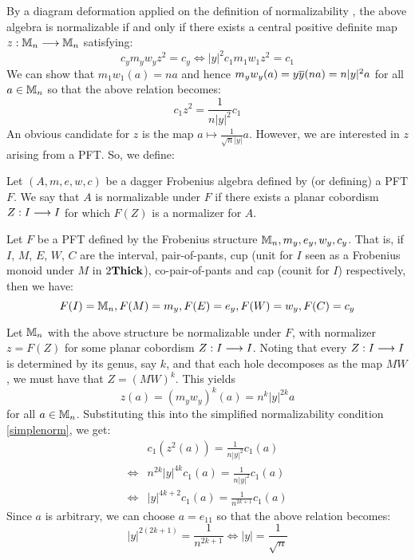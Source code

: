 \documentclass[./Thick_TQFTs_and_Quantum_Information.tex]{subfiles}
\begin{document}
By a diagram deformation applied on the definition of normalizability
\cite[9]{CatQChan}, the above algebra is normalizable if and only if there
exists a central positive definite map $z : \mathbb{M}_n \stackrel{}{\longrightarrow} \mathbb{M}_n$ satisfying:
\[
  c_ym_yw_yz^2 = c_y \iff |y|^2c_1m_1w_1z^2 = c_1
\]
We can show that $m_1w_1(a) = na$ and hence $m_yw_y(a) = y\overline{y} (na)
= n|y|^2 a$ for all $a \in \mathbb{M}_n$ so that the above relation becomes:
\begin{equation}\label{simplenorm}
  c_1z^2 = \frac{1}{n|y|^2}c_1
\end{equation}
An obvious candidate for $z$ is the map $a \mapsto \frac{1}{\sqrt{n}|y|} a$.
However, we are interested in $z$ arising from a PFT. So, we define:
\begin{defn}
Let $(A, m, e, w, c)$ be a dagger Frobenius algebra defined by (or defining) a
PFT $F$. We say that $A$ is normalizable under $F$ if there exists a planar
cobordism $Z : I \stackrel{}{\longrightarrow} I$ for which $F(Z)$ is a normalizer for $A$.
\end{defn}

Let $F$ be a PFT defined by the Frobenius structure $\mathbb{M}_n, m_y, e_y, w_y, c_y$.
That is, if $I$, $M$, $E$, $W$, $C$ are the interval, pair-of-pants, cup (unit
for $I$ seen as a Frobenius monoid under $M$ in $2\textbf{Thick}$), co-pair-of-pants and
cap (counit for $I$) respectively, then we have:
\[
  F(I) = \mathbb{M}_n, F(M) = m_y, F(E) = e_y, F(W) = w_y, F(C) = c_y
\]

Let $\mathbb{M}_{n}$ with the above structure be normalizable under $F$, with normalizer
$z = F(Z)$ for some planar cobordism $Z : I \stackrel{}{\longrightarrow} I$. Noting that every
$Z : I \stackrel{}{\longrightarrow} I$ is determined by its genus, say $k$, and that each hole
decomposes as the map $MW$, we must have that $Z = (MW)^k$. This yields
\[
  z(a) = (m_yw_y)^k(a) = n^{k}|y|^{2k}a
\]
for all $a \in \mathbb{M}_n$. Substituting this into the simplified normalizability
condition \eqref{simplenorm}, we get:
\begin{align*}
       & c_1(z^2(a)) = \frac{1}{n|y|^2} c_1(a)\\
  \iff & n^{2k}|y|^{4k} c_1(a) = \frac{1}{n|y|^2} c_1(a)\\
  \iff & |y|^{4k + 2}c_1(a) = \frac{1}{n^{2k + 1}} c_1(a)
\end{align*}
Since $a$ is arbitrary, we can choose $a = e_{11}$ so that the above relation
becomes:
\[
  |y|^{2(2k + 1)} = \frac{1}{n^{2k + 1}}
  \iff |y| = \frac{1}{\sqrt{n}}
\]
\end{document}
